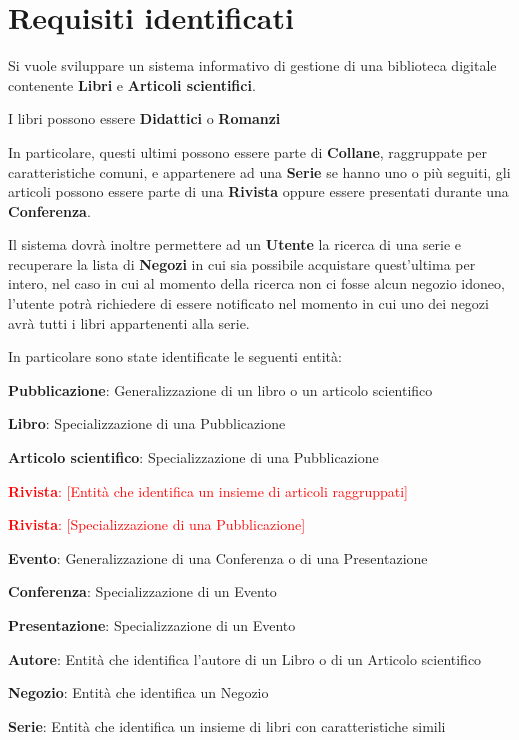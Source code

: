 \chapter{Requisiti identificati}
Si vuole sviluppare un sistema informativo di gestione di una biblioteca digitale contenente \textbf{Libri} e
\textbf{Articoli scientifici}.

I libri possono essere \textbf{Didattici} o \textbf{Romanzi}

In particolare, questi ultimi possono essere parte di \textbf{Collane}, raggruppate per caratteristiche
comuni, e appartenere ad una \textbf{Serie} se hanno uno o più seguiti, gli articoli possono essere parte
di una \textbf{Rivista} oppure essere presentati durante una \textbf{Conferenza}.

Il sistema dovrà inoltre permettere ad un \textbf{Utente} la ricerca di una serie
e recuperare la lista di \textbf{Negozi} in cui sia possibile acquistare quest'ultima per intero,
nel caso in cui al momento della ricerca non ci fosse alcun negozio idoneo, l'utente potrà richiedere
di essere notificato nel momento in cui uno dei negozi avrà tutti i libri appartenenti alla serie.


In particolare sono state identificate le seguenti entità:
\begin{enumerate}
    \item \textbf{Pubblicazione}: Generalizzazione di un libro o un articolo scientifico
    \item \textbf{Libro}: Specializzazione di una Pubblicazione
    \item \textbf{Articolo scientifico}: Specializzazione di una Pubblicazione
    \textcolor{red}{
        \item \textbf{Rivista}: [Entità che identifica un insieme di articoli raggruppati]
        \item \textbf{Rivista}: [Specializzazione di una Pubblicazione]
        }
    \item \textbf{Evento}: Generalizzazione di una Conferenza o di una Presentazione
    \item \textbf{Conferenza}: Specializzazione di un Evento
    \item \textbf{Presentazione}: Specializzazione di un Evento
    \item \textbf{Autore}: Entità che identifica l'autore di un Libro o di un Articolo scientifico
    \item \textbf{Negozio}: Entità che identifica un Negozio
    \item \textbf{Serie}: Entità che identifica un insieme di libri con caratteristiche simili
\end{enumerate}